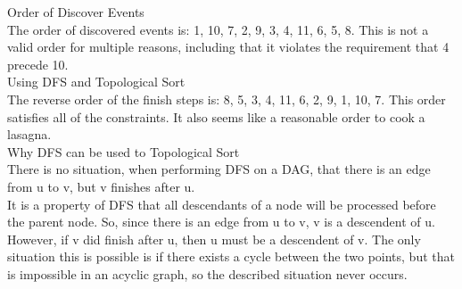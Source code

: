 \documentclass[12pt,twoside]{article}
\begin{document}
\begin{problems}
\begin{problemparts}
\problempart Order of Discover Events\\
The order of discovered events is: 1, 10, 7, 2, 9, 3, 4, 11, 6, 5, 8.  This is not a valid order for multiple reasons, including that it violates the requirement that 4 precede 10.\\

\problempart Using DFS and Topological Sort\\
The reverse order of the finish steps is: 8, 5, 3, 4, 11, 6, 2, 9, 1, 10, 7. This order satisfies all of the constraints.  It also seems like a reasonable order to cook a lasagna.\\

\problempart Why DFS can be used to Topological Sort\\
There is no situation, when performing DFS on a DAG, that there is an edge from u to v, but v finishes after u.\\

It is a property of DFS that all descendants of a node will be processed before the parent node.  So, since there is an edge from u to v, v is a descendent of u.  However, if v did finish after u, then u must be a descendent of v.  The only situation this is possible is if there exists a cycle between the two points, but that is impossible in an acyclic graph, so the described situation never occurs.\\


\end{problemparts}
\end{problems}
\end{document}
